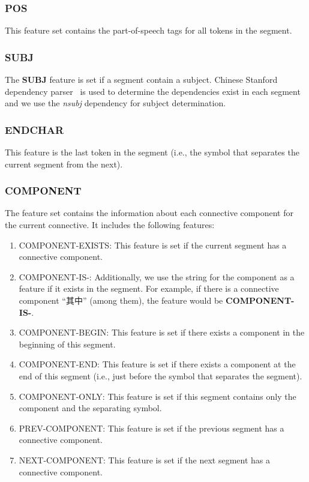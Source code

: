 
\subsubsection{POS}

This feature set contains the part-of-speech tags for all tokens in the segment.

\subsubsection{SUBJ}

The \textbf{SUBJ} feature is set if a segment contain a subject. Chinese Stanford
dependency parser~\citep{chang2009discriminative} is used to determine the
dependencies exist in each segment and we use the \textit{nsubj} dependency
for subject determination.


\subsubsection{ENDCHAR}

This feature is the last token in the segment (i.e., the symbol that separates
the current segment from the next).

\subsubsection{COMPONENT}

The feature set contains the information about each connective component for
the current connective. It includes the following features:

\begin{enumerate}
\item COMPONENT-EXISTS: This feature is set if the current segment has
a connective component.

\item COMPONENT-IS-: Additionally, we use the string for the component as a feature
if it exists in the segment. For example, if there is a connective component
``其中'' (among them), the feature would be \textbf{COMPONENT-IS-}.

\item COMPONENT-BEGIN: This feature is set if there exists a component in
the beginning of this segment.

\item COMPONENT-END: This feature is set if there exists a component at
the end of this segment (i.e., just before the symbol that separates the segment).

\item COMPONENT-ONLY: This feature is set if this segment contains only
the component and the separating symbol.

\item PREV-COMPONENT: This feature is set if the previous segment has
a connective component.

\item NEXT-COMPONENT: This feature is set if the next segment has
a connective component.
\end{enumerate}

